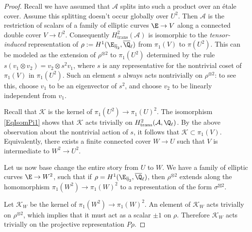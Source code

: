 \documentclass{article}
\newcommand{\adam}[1]{\textcolor{blue}{#1}}
\begin{document}
\begin{proof} Recall we have assumed that $\mathcal{A}$ splits into such a product over an \'etale cover.  Assume this splitting doesn't occur globally over $U^2$.  Then $\mathcal{A}$ is the restriction of scalars of a family of elliptic curves $\E\to V$ along a connected double cover $V\to U^2$.  Consequently $H^2_{\text{trans}}(\mathcal{A})$ is isomorphic to the {\em {tensor-induced}} representation of $\rho:=H^1(\E_{\overline{\eta}_2},\overline{\Q}_\ell)$ from $\pi_1(V)$ to $\pi(U^2)$.  This can be modeled as the extension of $\rho^{\otimes 2}$ to $\pi_1(U^2)$ determined by the rule $s(v_1\otimes v_2)=v_2\otimes s^2 v_1$, where $s$ is any representative for the nontrivial coset of $\pi_1(V)$ in $\pi_1(U^2)$.  Such an element $s$ always acts nontrivially on $\rho^{\otimes 2}$:  to see this, choose $v_1$ to be an eigenvector of $s^2$, and choose $v_2$ to be linearly independent from $v_1$.  

Recall that $\mathcal{K}$ is the kernel of $\pi_1(U^2)\to \pi_1(U)^2$.  
The isomorphism \eqref{EqIsomPi1} shows that $\mathcal{K}$ acts trivially on $H^2_{\text{trans}}(\mathcal{A},\Q_\ell)$.  By the above observation about the nontrivial action of $s$, it follows that $\mathcal{K}\subset \pi_1(V)$.  Equivalently, there exists a finite connected cover $W\to U$ such that $V$ is intermediate to $W^2\to U^2$.  %

Let us now base change the entire story from $U$ to $W$.  We have a family of elliptic curves $\E\to W^2$, such that if $\rho=H^1(\E_{\overline{\eta}_2},\overline{\Q}_\ell)$, then $\rho^{\otimes 2}$ extends along the homomorphism $\pi_1(W^2)\to \pi_1(W)^2$ to a representation of the form $\sigma^{\boxtimes 2}$.  

Let $\mathcal{K}_W$ be the kernel of $\pi_1(W^2)\to \pi_1(W)^2$.  An element of $\mathcal{K}_W$ acts trivially on $\rho^{\otimes 2}$, which implies that it must act as a scalar $\pm 1$ on $\rho$.  Therefore $\mathcal{K}_W$ acts trivially on the projective representation $P\rho$.


\end{proof}
\end{document}
